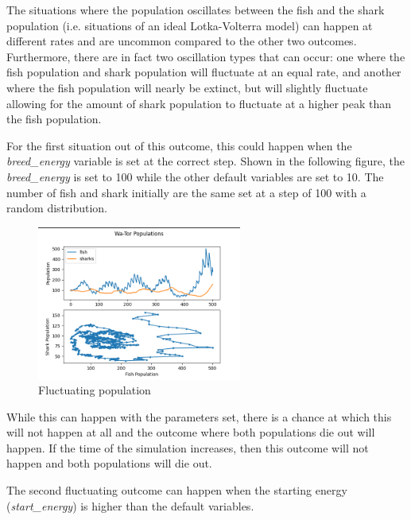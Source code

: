 \documentclass[12pt]{iopart} %
\begin{document}
The situations where the population oscillates between the fish and the shark population (i.e. situations of an ideal Lotka-Volterra model) can happen at different rates and are uncommon compared to the other two outcomes. 
Furthermore, there are in fact two oscillation types that can occur: one where the fish population and shark population will fluctuate at an equal rate, and another where the fish population will nearly be extinct, but will slightly fluctuate allowing for the amount of shark population to fluctuate at a higher peak than the fish population.

For the first situation out of this outcome, this could happen when the \emph{breed\_energy} variable is set at the correct step. 
Shown in the following figure, the \emph{breed\_energy} is set to 100 while the other default variables are set to 10. 
The number of fish and shark initially are the same set at a step of 100 with a random distribution.

\begin{figure}[h!tbp]
  \begin{center}
  \item[]\includegraphics[width=0.6\textwidth]{figure8.png}
  \caption{\label{fig:figure8}
  Fluctuating population
  }
  \end{center}
\end{figure}

While this can happen with the parameters set, there is a chance at which this will not happen at all and the outcome where both populations die out will happen. 
If the time of the simulation increases, then this outcome will not happen and both populations will die out.

The second fluctuating outcome can happen when the starting energy (\emph{start\_energy}) is higher than the default variables.
\end{document}
